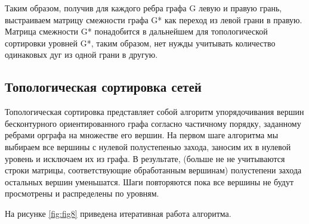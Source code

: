 Таким образом, получив для каждого ребра графа G левую и правую грань, выстраиваем матрицу смежности графа G* как переход из левой грани в правую. Матрица смежности G* понадобится в дальнейшем для топологической сортировки уровней G*, таким образом, нет нужды учитывать количество одинаковых дуг из одной грани в другую.

\subsection{Топологическая сортировка сетей}

Топологическая сортировка представляет собой алгоритм упорядочивания вершин бесконтурного ориентированного графа согласно частичному порядку, заданному ребрами орграфа на множестве его вершин. На первом шаге алгоритма мы выбираем все вершины с нулевой полустепенью захода, заносим их в нулевой уровень и исключаем их из графа. В результате, (больше не не учитываются строки матрицы, соответствующие обработанным вершинам) полустепени захода остальных вершин уменьшатся. Шаги повторяются пока все вершины не будут просмотрены и распределены по уровням.

На рисунке \ref{fig:fig8} приведена итеративная работа алгоритма.


